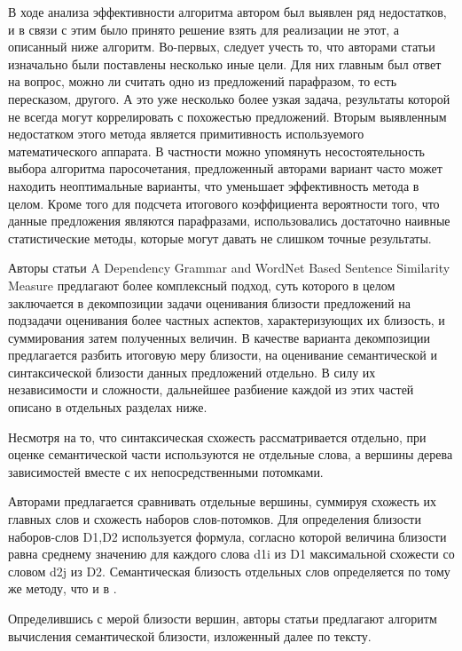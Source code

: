 В ходе анализа эффективности алгоритма автором был выявлен ряд недостатков,
и в связи с этим было принято решение взять для реализации не этот, а описанный ниже алгоритм.
Во-первых, следует учесть то, что авторами статьи изначально были поставлены несколько иные
цели. Для них главным был ответ на вопрос, можно ли считать одно из предложений парафразом,
то есть пересказом, другого. А это уже несколько более узкая задача,
результаты которой не всегда могут коррелировать с похожестью предложений.
Вторым выявленным недостатком этого метода является примитивность
используемого математического аппарата. В частности можно
упомянуть несостоятельность выбора алгоритма паросочетания, 
предложенный авторами вариант часто может находить неоптимальные варианты,
что уменьшает эффективность метода в целом. Кроме того для
подсчета итогового коэффициента вероятности того, что данные предложения
являются парафразами, использовались достаточно наивные статистические методы,
которые могут давать не слишком точные результаты.

Авторы статьи A Dependency Grammar and WordNet Based Sentence Similarity Measure\cite{complexSim}
предлагают более комплексный подход, суть которого в целом заключается в декомпозиции задачи
оценивания близости предложений на подзадачи оценивания более частных аспектов, 
характеризующих их близость, и суммирования затем полученных величин.
В качестве варианта декомпозиции предлагается разбить итоговую меру близости, 
на оценивание семантической и синтаксической близости данных предложений отдельно.
В силу их независимости и сложности, дальнейшее разбиение
каждой из этих частей описано в отдельных разделах ниже.

Несмотря на то, что синтаксическая схожесть рассматривается отдельно, 
при оценке семантической части используются не отдельные слова, а
вершины дерева зависимостей вместе с их непосредственными потомками.

Авторами предлагается сравнивать отдельные вершины, суммируя схожесть их главных слов
и схожесть наборов слов-потомков.
Для определения близости наборов-слов D1,D2 используется формула, согласно которой
величина близости равна среднему значению для каждого слова d1i из D1 максимальной схожести
со словом d2j из D2. 
Семантическая близость отдельных слов определяется по тому же методу, что и в \cite{wordnetSim}.

Определившись с мерой близости вершин, авторы статьи предлагают 
алгоритм вычисления семантической близости, изложенный далее по тексту.

